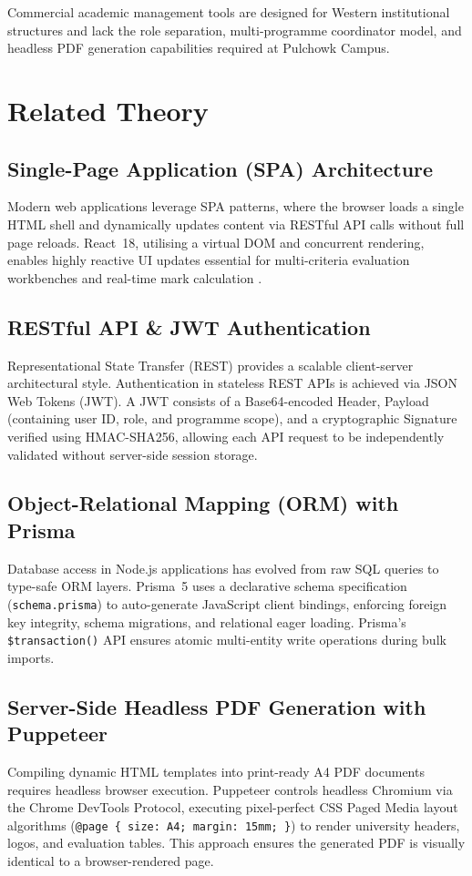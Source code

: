 \documentclass[12pt]{report}
\begin{document}
Commercial academic management tools are designed for Western institutional structures
and lack the role separation, multi-programme coordinator model, and headless PDF
generation capabilities required at Pulchowk Campus.

\section{Related Theory}

\subsection{Single-Page Application (SPA) Architecture}
Modern web applications leverage SPA patterns, where the browser loads a single HTML
shell and dynamically updates content via RESTful API calls without full page reloads.
React~18, utilising a virtual DOM and concurrent rendering, enables highly reactive UI
updates essential for multi-criteria evaluation workbenches and real-time mark
calculation \citep{fielding2000architectural}.

\subsection{RESTful API \& JWT Authentication}
Representational State Transfer (REST) provides a scalable client-server architectural
style. Authentication in stateless REST APIs is achieved via JSON Web Tokens (JWT). A
JWT consists of a Base64-encoded Header, Payload (containing user ID, role, and
programme scope), and a cryptographic Signature verified using HMAC-SHA256, allowing
each API request to be independently validated without server-side session storage.

\subsection{Object-Relational Mapping (ORM) with Prisma}
Database access in Node.js applications has evolved from raw SQL queries to type-safe
ORM layers. Prisma~5 uses a declarative schema specification (\texttt{schema.prisma})
to auto-generate JavaScript client bindings, enforcing foreign key integrity, schema
migrations, and relational eager loading. Prisma's \texttt{\$transaction()} API ensures
atomic multi-entity write operations during bulk imports.

\subsection{Server-Side Headless PDF Generation with Puppeteer}
Compiling dynamic HTML templates into print-ready A4 PDF documents requires headless
browser execution. Puppeteer controls headless Chromium via the Chrome DevTools
Protocol, executing pixel-perfect CSS Paged Media layout algorithms
(\texttt{@page \{ size: A4; margin: 15mm; \}}) to render university headers, logos, and
evaluation tables. This approach ensures the generated PDF is visually identical to a
browser-rendered page.
\end{document}
